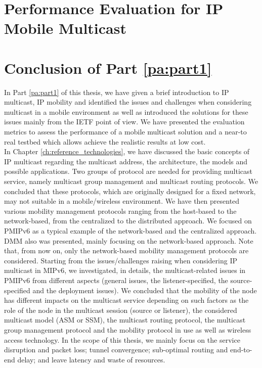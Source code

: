 \documentclass[a4paper,10pt,twoside]{ThesisStyle}
\begin{document}
\chapter{Performance Evaluation for IP Mobile Multicast}
\label{ch:performance_evaluation}


\chapter*{Conclusion of Part \ref{pa:part1}}
In Part \ref{pa:part1} of this thesis, we have given a brief introduction to IP multicast, IP mobility and identified the issues and challenges when considering multicast in a mobile environment as well as introduced the solutions for these issues mainly from the IETF point of view. We have presented the evaluation metrics to assess the performance of a mobile multicast solution and a near-to real testbed which allows achieve the realistic results at low cost. \\

In Chapter \ref{ch:reference_technologies}, we have discussed the basic concepts of IP multicast regarding the multicast address, the architecture, the models and possible applications. Two groups of protocol are needed for providing multicast service, namely multicast group management and multicast routing protocols. We concluded that these protocols, which are originally designed for a fixed network, may not suitable in a mobile/wireless environment. We have then presented various mobility management protocols ranging from the host-based to the network-based, from the centralized to the distributed approach. We focused on PMIPv6 as a typical example of the network-based and the centralized approach. DMM also was presented, mainly focusing on the network-based approach. Note that, from now on, only the network-based mobility management protocols are considered. Starting from the issues/challenges raising when considering IP multicast in MIPv6, we investigated, in details, the multicast-related issues in PMIPv6 from different aspects (general issues, the listener-specified, the source-specified and the deployment issues). We concluded that the mobility of the node has different impacts on the multicast service depending on such factors as the role of the node in the multicast session (source or listener), the considered multicast model (ASM or SSM), the multicast routing protocol, the multicast group management protocol and the mobility protocol in use as well as wireless access technology. In the scope of this thesis, we mainly focus on the service disruption and packet loss; tunnel convergence; sub-optimal routing and end-to-end delay; and leave latency and waste of resources.  \\
\end{document}
